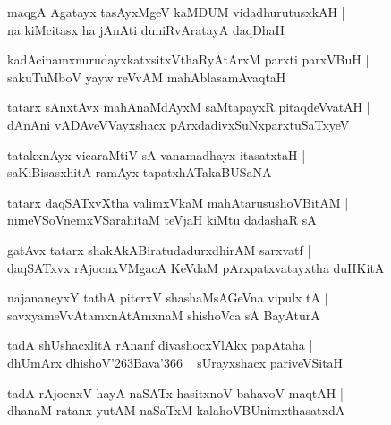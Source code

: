 \documentclass[twoside,12pt,openright]{book}
\def\S{\char'263}
\newcounter{shloka}[chapter]
\begin{document}
\begin{shloka}%
maqgA Agatayx tasAyxMgeV kaMDUM vidadhurutusxkAH |\\
na kiMcitasx ha jAnAti duniRvAratayA daqDhaH 
\end{shloka}

\begin{shloka}%
kadAcinamxnurudayxkatxsitxVthaRyAtArxM parxti parxVBuH |\\
sakuTuMboV yayw reVvAM mahAblasamAvaqtaH 
\end{shloka}

\begin{shloka}%
tatarx sAnxtAvx mahAnaMdAyxM saMtapayxR pitaqdeVvatAH |\\
dAnAni vADAveVVayxshacx pArxdadivxSuNxparxtuSaTxyeV
\end{shloka}

\begin{shloka}%
tatakxnAyx vicaraMtiV sA vanamadhayx itasatxtaH |\\
saKiBisasxhitA ramAyx tapatxhATakaBUSaNA
\end{shloka}

\begin{shloka}%
tatarx daqSATxvXtha valimxVkaM mahAtarusushoVBitAM |\\
nimeVSoVnemxVSarahitaM teVjaH  kiMtu dadashaR sA 
\end{shloka}

\begin{shloka}%
gatAvx tatarx shakAkABiratudadurxdhirAM sarxvatf |\\
daqSATxvx rAjocnxVMgacA KeVdaM pArxpatxvatayxtha duHKitA
\end{shloka}

\begin{shloka}%
najananeyxY tathA piterxV shashaMsAGeVna vipulx tA |\\
savxyameVvAtamxnAtAmxnaM shishoVca sA BayAturA 
\end{shloka}

\begin{shloka}%
tadA shUshacxlitA rAnanf divashocxVlAkx papAtaha |\\
dhUmArx  dhishoV\S Bava\char'366 ~ sUrayxshacx pariveVSitaH 
\end{shloka}

\begin{shloka}%
tadA rAjocnxV hayA naSATx hasitxnoV bahavoV maqtAH |\\
dhanaM ratanx yutAM naSaTxM kalahoVBUnimxthasatxdA 
\end{shloka}
\end{document}
